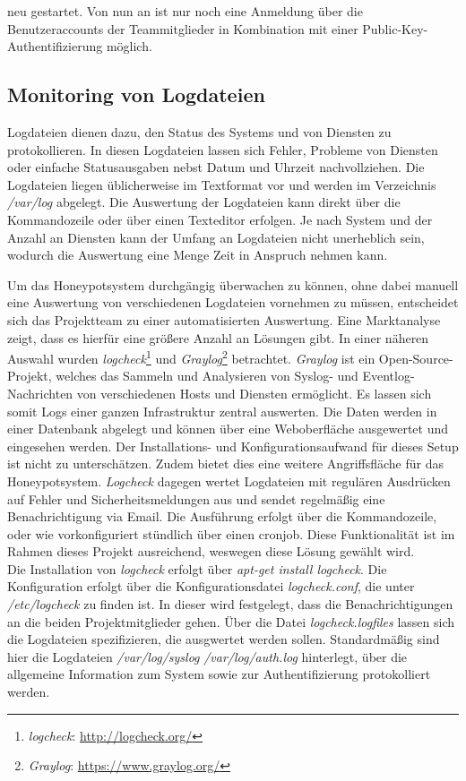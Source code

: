 neu gestartet. Von nun an ist nur noch eine Anmeldung über die Benutzeraccounts der Teammitglieder in Kombination mit einer Public-Key-Authentifizierung möglich.


\subsection{Monitoring von Logdateien}
\label{subsec:Monitoring von Logdateien}

Logdateien dienen dazu, den Status des Systems und von Diensten zu protokollieren. In diesen Logdateien lassen sich Fehler, Probleme von Diensten oder einfache Statusausgaben nebst Datum und Uhrzeit nachvollziehen. Die Logdateien liegen üblicherweise im Textformat vor und werden im Verzeichnis \textit{/var/log} abgelegt. Die Auswertung der Logdateien kann direkt über die Kommandozeile oder über einen Texteditor erfolgen. Je nach System und der Anzahl an Diensten kann der Umfang an Logdateien nicht unerheblich sein, wodurch die Auswertung eine Menge Zeit in Anspruch nehmen kann.

Um das Honeypotsystem durchgängig überwachen zu können, ohne dabei manuell eine Auswertung von verschiedenen Logdateien vornehmen zu müssen, entscheidet sich das Projektteam zu einer automatisierten Auswertung. Eine Marktanalyse zeigt, dass es hierfür eine größere Anzahl an Lösungen gibt. In einer näheren Auswahl wurden \textit{logcheck}\footnote{ \textit{logcheck}: \url{http://logcheck.org/}} und \textit{Graylog}\footnote{ \textit{Graylog}: \url{https://www.graylog.org/}} betrachtet. \textit{Graylog} ist ein Open-Source-Projekt, welches das Sammeln und Analysieren von Syslog- und Eventlog-Nachrichten von verschiedenen Hosts und Diensten ermöglicht. Es lassen sich somit Logs einer ganzen Infrastruktur zentral auswerten. Die Daten werden in einer Datenbank abgelegt und können über eine Weboberfläche ausgewertet und eingesehen werden. Der Installations- und Konfigurationsaufwand für dieses Setup ist nicht zu unterschätzen. Zudem bietet dies eine weitere Angriffsfläche für das Honeypotsystem. \textit{Logcheck} dagegen wertet Logdateien mit regulären Ausdrücken auf Fehler und Sicherheitsmeldungen aus und sendet regelmäßig eine Benachrichtigung via Email. Die Ausführung erfolgt über die Kommandozeile, oder wie vorkonfiguriert stündlich über einen cronjob. Diese Funktionalität ist im Rahmen dieses Projekt ausreichend, weswegen diese Lösung gewählt wird.\\

Die Installation von \textit{logcheck} erfolgt über \textit{apt-get install logcheck}. Die Konfiguration erfolgt über die Konfigurationsdatei \textit{logcheck.conf}, die unter \textit{/etc/logcheck} zu finden ist. In dieser wird festgelegt, dass die Benachrichtigungen an die beiden Projektmitglieder gehen. Über die Datei \textit{logcheck.logfiles} lassen sich die Logdateien spezifizieren, die ausgwertet werden sollen. Standardmäßig sind hier die Logdateien \textit{/var/log/syslog} \textit{/var/log/auth.log} hinterlegt, über die allgemeine Information zum System sowie zur Authentifizierung protokolliert werden.

